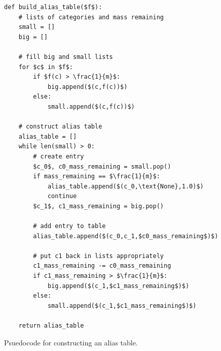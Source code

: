     \begin{Listing}
        \begin{lstlisting}
def build_alias_table($f$):
    # lists of categories and mass remaining
    small = []
    big = []
    
    # fill big and small lists
    for $c$ in $f$:
        if $f(c) > \frac{1}{m}$:
            big.append($(c,f(c))$)
        else:
            small.append($(c,f(c))$)

    # construct alias table
    alias_table = []
    while len(small) > 0:
        # create entry
        $c_0$, c0_mass_remaining = small.pop()
        if mass_remaining == $\frac{1}{m}$:
            alias_table.append($(c_0,\text{None},1.0)$)
            continue
        $c_1$, c1_mass_remaining = big.pop()

        # add entry to table
        alias_table.append($(c_0,c_1,$c0_mass_remaining$)$)

        # put c1 back in lists appropriately
        c1_mass_remaining -= c0_mass_remaining
        if c1_mass_remaining > $\frac{1}{m}$:
            big.append($(c_1,$c1_mass_remaining$)$)
        else:
            small.append($(c_1,$c1_mass_remaining$)$)
        
    return alias_table
        \end{lstlisting}
        \caption{Psuedocode for constructing an alias table.}
        \label{lst:alias_table_sample}
    \end{Listing}





